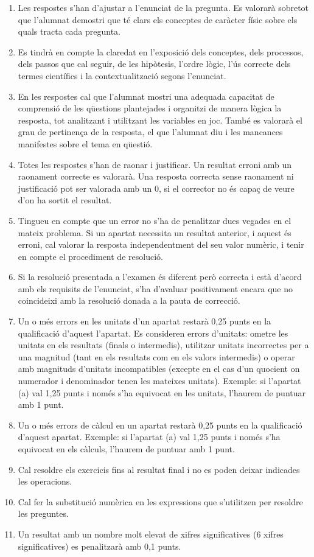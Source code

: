 \begin{enumerate}
  \item Les respostes s'han d'ajustar a l'enunciat de la pregunta. Es valorarà sobretot que l'alumnat demostri que té clars els conceptes de caràcter físic sobre els quals tracta cada pregunta.
  \item Es tindrà en compte la claredat en l'exposició dels conceptes, dels processos, dels passos que cal seguir, de les hipòtesis, l'ordre lògic, l'ús correcte dels termes científics i la contextualització segons l'enunciat.
  \item En les respostes cal que l'alumnat mostri una adequada capacitat de comprensió de les qüestions plantejades i organitzi de manera lògica la resposta, tot analitzant i utilitzant les variables en joc. També es valorarà el grau de pertinença de la resposta, el que l'alumnat diu i les mancances manifestes sobre el tema en qüestió.
  \item Totes les respostes s'han de raonar i justificar. Un resultat erroni amb un raonament correcte es valorarà. Una resposta correcta sense raonament ni justificació pot ser valorada amb un 0, si el corrector no és capaç de veure d'on ha sortit el resultat.
  \item Tingueu en compte que un error no s'ha de penalitzar dues vegades en el mateix problema. Si un apartat necessita un resultat anterior, i aquest és erroni, cal valorar la resposta independentment del seu valor numèric, i tenir en compte el procediment de resolució.
  \item Si la resolució presentada a l'examen és diferent però correcta i està d'acord amb els requisits de l'enunciat, s'ha d'avaluar positivament encara que no coincideixi amb la resolució donada a la pauta de correcció.
  \item Un o més errors en les unitats d'un apartat restarà 0,25 punts en la qualificació d'aquest l'apartat. Es consideren errors d'unitats: ometre les unitats en els resultats (finals o intermedis), utilitzar unitats incorrectes per a una magnitud (tant en els resultats com en els valors intermedis) o operar amb magnituds d'unitats incompatibles (excepte en el cas d'un quocient on numerador i denominador tenen les mateixes unitats). Exemple: si l'apartat (a) val 1,25 punts i només s'ha equivocat en les unitats, l'haurem de puntuar amb 1 punt.
  \item Un o més errors de càlcul en un apartat restarà 0,25 punts en la qualificació d'aquest apartat. Exemple: si l'apartat (a) val 1,25 punts i només s'ha equivocat en els càlculs, l'haurem de puntuar amb 1 punt.
  \item Cal resoldre els exercicis fins al resultat final i no es poden deixar indicades les operacions.
  \item Cal fer la substitució numèrica en les expressions que s'utilitzen per resoldre les preguntes.
  \item Un resultat amb un nombre molt elevat de xifres significatives (6 xifres significatives) es penalitzarà amb 0,1 punts.
\end{enumerate}
